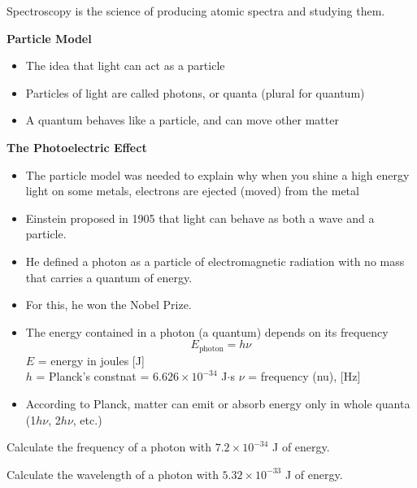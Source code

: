 \documentclass[../hchem.tex]{subfiles}
\begin{document}
Spectroscopy is the science of producing atomic spectra and studying them.

\textbf{Particle Model}
\begin{itemize}
    \item The idea that light can act as a particle 
    \item Particles of light are called photons, or quanta (plural for quantum)
    \item A quantum behaves like a particle, and can move other matter 
\end{itemize}

\textbf{The Photoelectric Effect}
\begin{itemize}
    \item The particle model was needed to explain why when you shine a high energy light on some metals, electrons are ejected (moved) from the metal 
\end{itemize}

\begin{itemize}
    \item Einstein proposed in 1905 that light can behave as both a wave and a particle.
    \item He defined a photon as a particle of electromagnetic radiation with no mass that carries a quantum of energy.
    \item For this, he won the Nobel Prize.
\end{itemize}

\begin{itemize}
    \item The energy contained in a photon (a quantum) depends on its frequency 
    \[E_{\text{photon}}=h\nu\]
    $E$ = energy in joules [J]\\
    $h$ = Planck's constnat = $6.626\times 10^{-34}$ J$\cdot$s 
    $\nu$ = frequency (nu), [Hz]
    \item According to Planck, matter can emit or absorb energy only in whole quanta (1$h\nu$, 2$h\nu$, etc.)
\end{itemize}

\ex Calculate the frequency of a photon with $7.2\times10^{-34}$ J of energy. 

\ex Calculate the wavelength of a photon with $5.32\times 10^{-33}$ J of energy.
\end{document}
